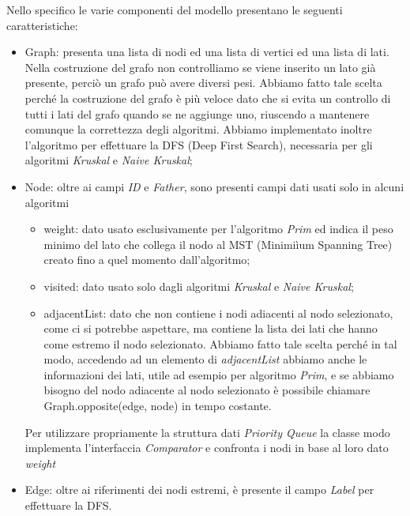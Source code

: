 Nello specifico le varie componenti del modello presentano le seguenti caratteristiche:
\begin{itemize}
	\item Graph: presenta una lista di nodi ed una lista di vertici ed una lista di lati. Nella costruzione del grafo non controlliamo se viene inserito un lato già presente, perciò un grafo può avere diversi pesi. Abbiamo fatto tale scelta perché la costruzione del grafo è più veloce dato che si evita un controllo di tutti i lati del grafo quando se ne aggiunge uno, riuscendo a mantenere comunque la correttezza degli algoritmi. Abbiamo implementato inoltre l'algoritmo per effettuare la DFS (Deep First Search), necessaria per gli algoritmi \textit{Kruskal} e \textit{Naive Kruskal};
	\item Node: oltre ai campi \textit{ID} e \textit{Father}, sono presenti campi dati usati solo in alcuni algoritmi
	\begin{itemize}
		\item weight: dato usato esclusivamente per l'algoritmo \textit{Prim} ed indica il peso minimo del lato che collega il nodo al MST (Minimiìum Spanning Tree) creato fino a quel momento dall'algoritmo;
		\item visited: dato usato solo dagli algoritmi \textit{Kruskal} e \textit{Naive Kruskal};
		\item adjacentList: dato che non contiene i nodi adiacenti al nodo selezionato, come ci si potrebbe aspettare, ma contiene la lista dei lati che hanno come estremo il nodo selezionato. Abbiamo fatto tale scelta perché in tal modo, accedendo ad un elemento di \textit{adjacentList} abbiamo anche le informazioni dei lati, utile ad esempio per algoritmo \textit{Prim}, e se abbiamo bisogno del nodo adiacente al nodo selezionato è possibile chiamare \textup{Graph.opposite(edge, node)} in tempo costante.
	\end{itemize}
	Per utilizzare propriamente la struttura dati \textit{Priority Queue} la classe modo implementa l'interfaccia \textit{Comparator} e confronta i nodi in base al loro dato \textit{weight}
	\item Edge: oltre ai riferimenti dei nodi estremi, è presente il campo \textit{Label} per effettuare la DFS. 
\end{itemize} 

